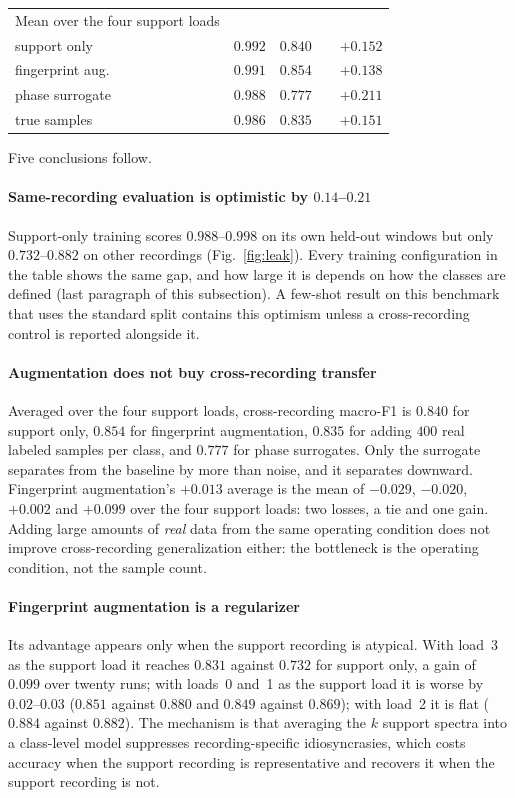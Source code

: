 \documentclass[journal]{IEEEtran}
\begin{document}
\begin{table}[t]
\begin{tabular}{llcccc}
\midrule
\multicolumn{2}{l}{Mean over the four support loads} & & & & \\
\multicolumn{2}{l}{\quad support only}      & $0.992$ & $0.840$ & & $+0.152$ \\
\multicolumn{2}{l}{\quad fingerprint aug.}  & $0.991$ & $0.854$ & & $+0.138$ \\
\multicolumn{2}{l}{\quad phase surrogate}  & $0.988$ & $0.777$ & & $+0.211$ \\
\multicolumn{2}{l}{\quad true samples}  & $0.986$ & $0.835$ & & $+0.151$ \\
\bottomrule
\end{tabular}
\end{table}

Five conclusions follow.

\paragraph{Same-recording evaluation is optimistic by $0.14$--$0.21$}
Support-only training scores $0.988$--$0.998$ on its own held-out windows but
only $0.732$--$0.882$ on other recordings (Fig.~\ref{fig:leak}). Every training
configuration in the table shows the same gap, and how large it is depends on
how the classes are defined (last paragraph of this subsection). A few-shot result on this
benchmark that uses the standard split contains this optimism unless a
cross-recording control is reported alongside it.

\paragraph{Augmentation does not buy cross-recording transfer}
Averaged over the four support loads, cross-recording macro-F1 is $0.840$ for
support only, $0.854$ for fingerprint augmentation, $0.835$ for adding $400$
real labeled samples per class, and $0.777$ for phase surrogates. Only the
surrogate separates from the baseline by more than noise, and it separates
downward. Fingerprint augmentation's $+0.013$ average is the mean of
$-0.029$, $-0.020$, $+0.002$ and $+0.099$ over the four support loads: two
losses, a tie and one gain. Adding large amounts of \emph{real} data from
the same operating condition does not improve cross-recording generalization
either: the bottleneck is the operating condition, not the sample count.

\paragraph{Fingerprint augmentation is a regularizer}
Its advantage appears only when the support recording is atypical. With
load~3 as the support load it reaches $0.831$ against $0.732$ for support only,
a gain of $0.099$ over twenty runs; with loads~0 and~1 as the support load it
is worse by $0.02$--$0.03$ ($0.851$ against $0.880$ and $0.849$ against
$0.869$); with load~2 it is flat ($0.884$ against $0.882$). The mechanism is
that averaging the $k$ support spectra into a class-level model suppresses
recording-specific idiosyncrasies, which costs accuracy when the support
recording is representative and recovers it when the support recording is not.
\end{document}
